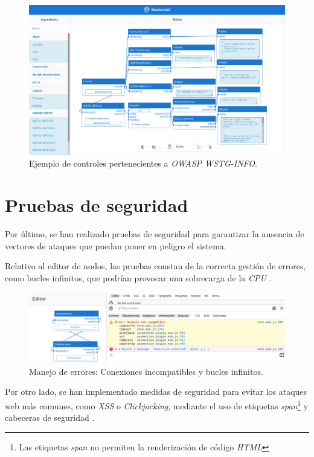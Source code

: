 \begin{figure}[H]
    \centering
    \includegraphics[width=13cm]{img/tables/34_Recipe-WSTG.png}
    \caption{Ejemplo de controles pertenecientes a \textit{OWASP WSTG-INFO}.}
    \label{fig:owasprecipe}
\end{figure}


\section{Pruebas de seguridad} \label{sec:securitytest}

Por último, se han realizado pruebas de seguridad para garantizar la ausencia de vectores de ataques que puedan poner en peligro el sistema.\sn

Relativo al editor de nodos, las pruebas constan de la correcta gestión de errores, como bucles infinitos, que podrían provocar una sobrecarga de la \textit{CPU} .

\begin{figure}[H]
    \centering
    \includegraphics[width=14cm]{img/tables/35_Recipe-Errors.png}
    \caption{Manejo de errores: Conexiones incompatibles y bucles infinitos.}
    \label{fig:reciperr}
\end{figure}

Por otro lado, se han implementado medidas de seguridad para evitar los ataques web más comunes, como \textit{XSS} o \textit{Clickjacking}, mediante el uso de etiquetas \textit{span}\footnote{Las etiquetas \textit{span} no permiten la renderización de código \textit{HTML}} y cabeceras de seguridad .\sn

